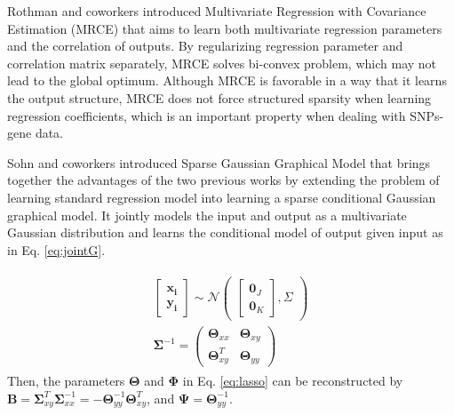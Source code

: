 \documentclass{article}
\begin{document}
Rothman and coworkers \cite{rothman2010sparse} introduced Multivariate Regression with Covariance Estimation (MRCE) that aims to learn both multivariate regression parameters and the correlation of outputs. By regularizing regression parameter and correlation matrix separately, MRCE solves bi-convex problem, which may not lead to the global optimum. Although MRCE is favorable in a way that it learns the output structure, MRCE does not force structured sparsity when learning regression coefficients, which is an important property when dealing with SNPs-gene data.


Sohn and coworkers \cite{sohn2012joint} introduced Sparse Gaussian Graphical Model that brings together the advantages of the two previous works by extending the problem of learning standard regression model into learning a sparse conditional Gaussian graphical model. It jointly models the input and output as a multivariate Gaussian distribution and learns the conditional model of output given input as in Eq. \ref{eq:jointG}.

\begin{align}\label{eq:jointG}
\begin{split}
\begin{bmatrix}
    \mathbf{x_i}\\
    \mathbf{y_i}
\end{bmatrix}
 \sim \mathcal{N}
 \begin{pmatrix}
\begin{bmatrix}
    \mathbf{0}_J  \\
   \mathbf{0}_K
\end{bmatrix}
,
    \Sigma
\end{pmatrix} \\
\mathbf{\Sigma}^{-1}= \begin{pmatrix}
    \mathbf{\Theta}_{xx} & \mathbf{\Theta}_{xy}\\
   \mathbf{\Theta}_{xy}^T &  \mathbf{\Theta}_{yy}  
\end{pmatrix}
\end{split}
\end{align}
Then, the parameters $\mathbf{\Theta}$ and $\mathbf{\Phi}$ in Eq. \ref{eq:lasso} can be reconstructed by $\mathbf{B}=\mathbf{\Sigma}_{xy}^T \mathbf{\Sigma}_{xx}^{-1}=-\mathbf{\Theta}_{yy}^{-1}\mathbf{\Theta}_{xy}^T$, and $\mathbf{\Psi}= \mathbf{\Theta}_{yy}^{-1}$.
\end{document}
